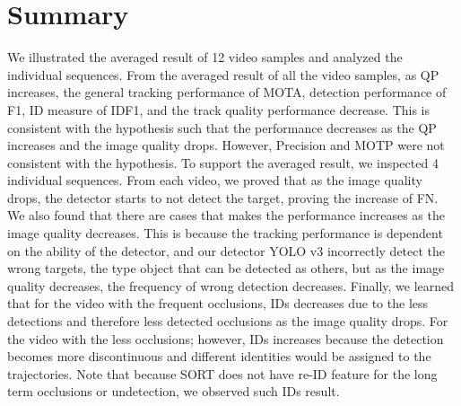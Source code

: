 \section{Summary}
\label{sec:results/summary}

We illustrated the averaged result of 12 video samples and analyzed the individual sequences. From the averaged result of all the video samples, as QP increases, the general tracking performance of MOTA, detection performance of F1, ID measure of IDF1, and the track quality performance decrease. This is consistent with the hypothesis such that the performance decreases as the QP increases and the image quality drops. However, Precision and MOTP were not consistent with the hypothesis. To support the averaged result, we inspected 4 individual sequences. From each video, we proved that as the image quality drops, the detector starts to not detect the target, proving the increase of FN. We also found that there are cases that makes the performance increases as the image quality decreases. This is because the tracking performance is dependent on the ability of the detector, and our detector YOLO v3 incorrectly detect the wrong targets, the type object that can be detected as others, but as the image quality decreases, the frequency of wrong detection decreases. Finally, we learned that for the video with the frequent occlusions, IDs decreases due to the less detections and therefore less detected occlusions as the image quality drops. For the video with the less occlusions; however, IDs increases because the detection becomes more discontinuous and different identities would be assigned to the trajectories. Note that because SORT does not have re-ID feature for the long term occlusions or undetection, we observed such IDs result.